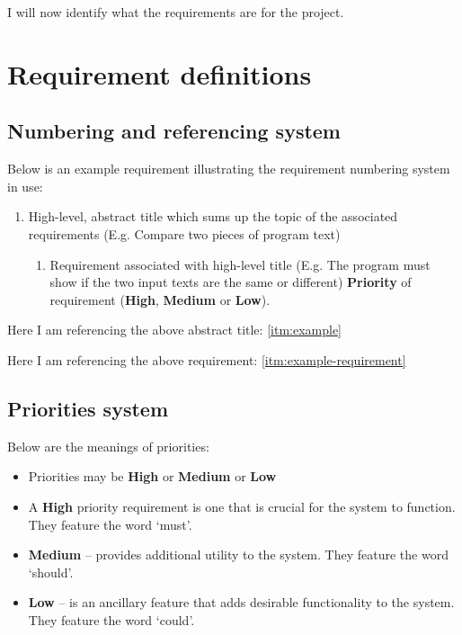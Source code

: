 I will now identify what the requirements are for the project.

\section{Requirement definitions}
\subsection{Numbering and referencing system}
Below is an example requirement illustrating the requirement numbering system
in use:
\begin{enumerate}
  \item High-level, abstract title which sums up the topic of the associated 
  requirements (E.g. Compare two pieces of program text)
  \label{itm:example}
    \begin{enumerate}
      \item Requirement associated with high-level title (E.g. The program must show if
	the two input texts are the same or different)
      \label{itm:example-requirement}
	\textbf{Priority} of requirement (\textbf{High}, \textbf{Medium} or
	\textbf{Low}).
    \end{enumerate}
\end{enumerate}

Here I am referencing the above abstract title: \ref{itm:example}

Here I am referencing the above requirement: \ref{itm:example-requirement}

\subsection{Priorities system}
Below are the meanings of priorities: 

\begin{itemize}
  \item Priorities may be \textbf{High} or \textbf{Medium} or \textbf{Low}
  \item A \textbf{High} priority requirement is one that is crucial for the system
    to function. They feature the word `must'.
  \item \textbf{Medium} -- provides additional utility to the
    system. They feature the word `should'.
  \item \textbf{Low} -- is an ancillary feature that adds
    desirable functionality to the system. They feature the word `could'.
\end{itemize}

